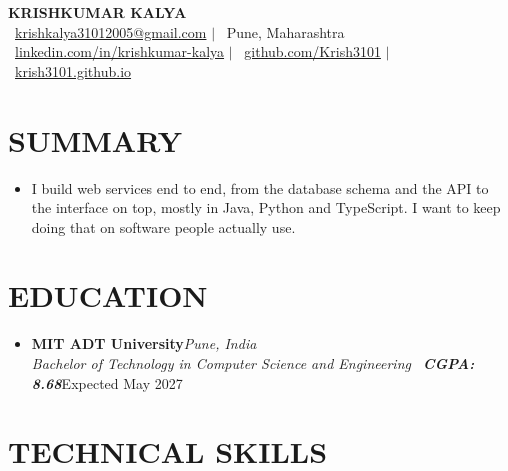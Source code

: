\documentclass[11pt,a4paper]{article}
\newcommand{\resumeSubheading}[4]{%
    \item[]
    \noindent
    \textbf{#1}\hfill\textit{#2}\\
    \textit{\small #3}\hfill\small #4
    \par\vspace{0.8pt}
}
\begin{document}

\begin{center}

{\LARGE\bfseries\color{darkblue} KRISHKUMAR KALYA}\\[2.5pt]

\small
\faEnvelope\ \href{mailto:krishkalya31012005@gmail.com}{krishkalya31012005@gmail.com}
\quad $|$ \quad
\faMapMarker\ Pune, Maharashtra
\\[1.5pt]

\faLinkedin\ \href{https://www.linkedin.com/in/krishkumar-kalya}{linkedin.com/in/krishkumar-kalya}
\quad $|$ \quad
\faGithub\ \href{https://github.com/Krish3101}{github.com/Krish3101}
\quad $|$ \quad
\faGlobe\ \href{https://krish3101.github.io}{krish3101.github.io}

\end{center}

\vspace{-4pt}


\section{SUMMARY}

\begin{itemize}[leftmargin=0pt]

\item[]\small{I build web services end to end, from the database schema and the API to the interface on top, mostly in Java, Python and TypeScript. I want to keep doing that on software people actually use.}

\end{itemize}


\section{EDUCATION}

\begin{itemize}[leftmargin=0pt]

\resumeSubheading
{MIT ADT University}
{Pune, India}
{Bachelor of Technology in Computer Science and Engineering \textbar\ \textbf{CGPA: 8.68}}
{Expected May 2027}

\end{itemize}


\section{TECHNICAL SKILLS}
\end{document}
